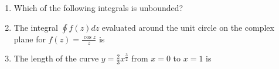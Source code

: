 \documentclass[journal,12pt,onecolumn]{IEEEtran}
\begin{document}
\begin{enumerate}
          \begin{enumerate}
          \end{enumerate}
    \item Which of the following integrals is unbounded?\\

          \begin{enumerate}
          \end{enumerate}

    \item The integral $\oint{f(z)dz}$ evaluated around the unit circle on the complex plane for $f(z) = \frac{\cos z}{z}$ is\\

          \begin{enumerate}
          \end{enumerate}

    \item The length of the curve $y=\frac{2}{3}x^{\frac{3}{2}}$ from $x=0$ to $x=1$ is\\

          \begin{enumerate}
          \end{enumerate}


\end{enumerate}
\end{document}
